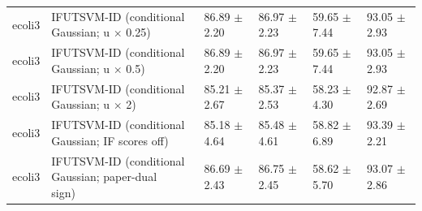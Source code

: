 \begin{table}[!t]
{\begin{tabular}{llllll}
ecoli3 & \shortstack[l]{IFUTSVM-ID (conditional\\Gaussian; u \(\times\) 0.25)} & 86.89 \(\pm\) 2.20 & 86.97 \(\pm\) 2.23 & 59.65 \(\pm\) 7.44 & 93.05 \(\pm\) 2.93 \\
ecoli3 & \shortstack[l]{IFUTSVM-ID (conditional\\Gaussian; u \(\times\) 0.5)} & 86.89 \(\pm\) 2.20 & 86.97 \(\pm\) 2.23 & 59.65 \(\pm\) 7.44 & 93.05 \(\pm\) 2.93 \\
ecoli3 & \shortstack[l]{IFUTSVM-ID (conditional\\Gaussian; u \(\times\) 2)} & 85.21 \(\pm\) 2.67 & 85.37 \(\pm\) 2.53 & 58.23 \(\pm\) 4.30 & 92.87 \(\pm\) 2.69 \\
ecoli3 & \shortstack[l]{IFUTSVM-ID (conditional\\Gaussian; IF scores off)} & 85.18 \(\pm\) 4.64 & 85.48 \(\pm\) 4.61 & 58.82 \(\pm\) 6.89 & 93.39 \(\pm\) 2.21 \\
ecoli3 & \shortstack[l]{IFUTSVM-ID (conditional\\Gaussian; paper-dual\\sign)} & 86.69 \(\pm\) 2.43 & 86.75 \(\pm\) 2.45 & 58.62 \(\pm\) 5.70 & 93.07 \(\pm\) 2.86 \\
\hline
\end{tabular}%
}
\end{table}

